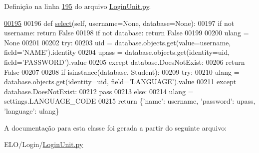 Definição na linha \hyperlink{LoginUnit_8py_source_l00195}{195} do arquivo \hyperlink{LoginUnit_8py_source}{Login\-Unit.\-py}.


\begin{DoxyCode}
\hypertarget{classLogin_1_1LoginUnit_1_1PersLogin_l00195}{}\hyperlink{classLogin_1_1LoginUnit_1_1PersLogin_a1847dbd744377283add2327d2eb0b99f}{00195} 
00196     \textcolor{keyword}{def }\hyperlink{classLogin_1_1LoginUnit_1_1PersLogin_a1847dbd744377283add2327d2eb0b99f}{select}(self, username=None, database=None):
00197         \textcolor{keywordflow}{if} \textcolor{keywordflow}{not} username: \textcolor{keywordflow}{return} \textcolor{keyword}{False}
00198         \textcolor{keywordflow}{if} \textcolor{keywordflow}{not} database: \textcolor{keywordflow}{return} \textcolor{keyword}{False}
00199 
00200         ulang = \textcolor{keywordtype}{None}
00201 
00202         \textcolor{keywordflow}{try}:
00203             uid = database.objects.get(value=username, field=\textcolor{stringliteral}{'NAME'}).identity
00204             upass = database.objects.get(identity=uid, field=\textcolor{stringliteral}{'PASSWORD'}).value
00205         \textcolor{keywordflow}{except} database.DoesNotExist:
00206             \textcolor{keywordflow}{return} \textcolor{keyword}{False}
00207 
00208         \textcolor{keywordflow}{if} isinstance(database, Student):
00209             \textcolor{keywordflow}{try}:
00210                 ulang = database.objects.get(identity=uid, field=\textcolor{stringliteral}{'LANGUAGE'}).value
00211             \textcolor{keywordflow}{except} database.DoesNotExist:
00212                 \textcolor{keywordflow}{pass}
00213         \textcolor{keywordflow}{else}:
00214             ulang = settings.LANGUAGE\_CODE
00215 
        \textcolor{keywordflow}{return} \{\textcolor{stringliteral}{'name'}: username, \textcolor{stringliteral}{'password'}: upass, \textcolor{stringliteral}{'language'}: ulang\}\end{DoxyCode}


A documentação para esta classe foi gerada a partir do seguinte arquivo\-:\begin{DoxyCompactItemize}
\item 
E\-L\-O/\-Login/\hyperlink{LoginUnit_8py}{Login\-Unit.\-py}\end{DoxyCompactItemize}
